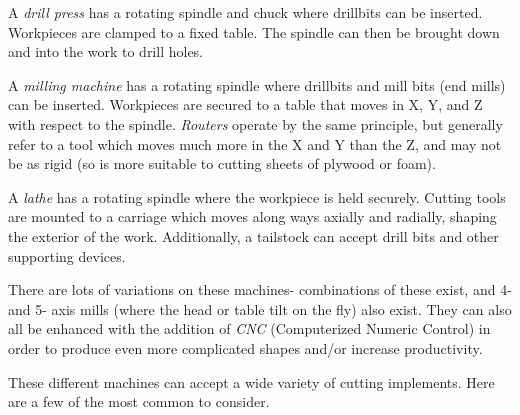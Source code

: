 \documentclass[10pt,letterpaper]{book}
\begin{document}
 \begin{asparaenum}[a)]
 	\item A \textit{drill press} has a rotating spindle and chuck where drillbits can be inserted. Workpieces are clamped to a fixed table. The spindle can then be brought down and into the work to drill holes.
 	\item A \textit{milling machine} has a rotating spindle where drillbits and mill bits (end mills) can be inserted. Workpieces are secured to a table that moves in X, Y, and Z with respect to the spindle. \textit{Routers} operate by the same principle, but generally refer to a tool which moves much more in the X and Y than the Z, and may not be as rigid (so is more suitable to cutting sheets of plywood or foam).
 	\item A \textit{lathe} has a rotating spindle where the workpiece is held securely. Cutting tools are mounted to a carriage which moves along ways axially and radially, shaping the exterior of the work. Additionally, a tailstock can accept drill bits and other supporting devices.
 \end{asparaenum}
 
  There are lots of variations on these machines- combinations of these exist, and 4- and 5- axis mills (where the head or table tilt on the fly) also exist. They can also all be enhanced with the addition of \textit{CNC} (Computerized Numeric Control) in order to produce even more complicated shapes and/or increase productivity.
  
 These different machines can accept a wide variety of cutting implements. Here are a few of the most common to consider.
 
\end{document}

